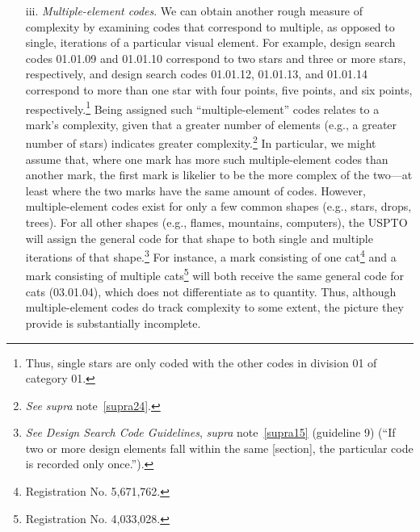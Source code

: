 \documentclass[letterpaper, 11pt, oneside]{article}
\begin{document}
\begin{enumerate}
\noindent But the mark on the left is fairly intricate and contains a substantial amount of ellipses/circles. It may not fall into the category of basic shapes. Conversely, marks whose only design search codes are in categories other than 01, 25, or 26 can still be simple—for example, the mark \texttt{[image: RN\_7099151\_drawing]},\footnote{Registration No. 7,099,151} whose only code is 06.01.04 (``mountains, mountain landscapes''). Accordingly, looking to the relative basicness of design search codes provides only a very rough measure of the complexity of the underlying marks.

\item[iii.] \textit{Multiple-element codes}. We can obtain another rough measure of complexity by examining codes that correspond to multiple, as opposed to single, iterations of a particular visual element. For example, design search codes 01.01.09 and 01.01.10 correspond to two stars and three or more stars, respectively, and design search codes 01.01.12, 01.01.13, and 01.01.14 correspond to more than one star with four points, five points, and six points, respectively.\footnote{Thus, single stars are only coded with the other codes in division 01 of category 01.} Being assigned such ``multiple-element'' codes relates to a mark's complexity, given that a greater number of elements (e.g., a greater number of stars) indicates greater complexity.\footnote{\textit{See supra} note~\ref{supra24}.} In particular, we might assume that, where one mark has more such multiple-element codes than another mark, the first mark is likelier to be the more complex of the two—at least where the two marks have the same amount of codes. However, multiple-element codes exist for only a few common shapes (e.g., stars, drops, trees). For all other shapes (e.g., flames, mountains, computers), the USPTO will assign the general code for that shape to both single and multiple iterations of that shape.\footnote{\textit{See Design Search Code Guidelines}, \textit{supra} note~\ref{supra15} (guideline 9) (``If two or more design elements fall within the same [section], the particular code is recorded only once.'').} For instance, a mark consisting of one cat\footnote{Registration No. 5,671,762.} and a mark consisting of multiple cats\footnote{Registration No. 4,033,028.} will both receive the same general code for cats (03.01.04), which does not differentiate as to quantity. Thus, although multiple-element codes do track complexity to some extent, the picture they provide is substantially incomplete.

\end{enumerate}
\end{document}
